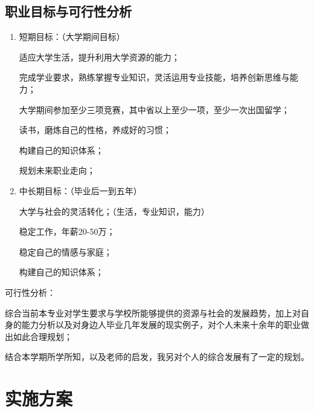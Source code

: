 \documentclass{article}
\begin{document}
\subsection{职业目标与可行性分析}
\par
\begin{enumerate}[(1)]
	\item 短期目标：（大学期间目标）\par
	适应大学生活，提升利用大学资源的能力；\par
	完成学业要求，熟练掌握专业知识，灵活运用专业技能，培养创新思维与能力；\par
	大学期间参加至少三项竞赛，其中省以上至少一项，至少一次出国留学；\par
	读书，磨炼自己的性格，养成好的习惯；\par
	构建自己的知识体系；\par
	规划未来职业走向；\par
	
	
	\item 中长期目标：（毕业后一到五年）\par
	大学与社会的灵活转化；（生活，专业知识，能力）\par
	稳定工作，年薪20-50万；\par
	稳定自己的情感与家庭；\par
	构建自己的知识体系；\par
\end{enumerate}
可行性分析：\par
综合当前本专业对学生要求与学校所能够提供的资源与社会的发展趋势，加上对自身的能力分析以及对身边人毕业几年发展的现实例子，对个人未来十余年的职业做出如此合理规划；\par
结合本学期所学所知，以及老师的启发，我另对个人的综合发展有了一定的规划。\par


\section{实施方案}
\end{document}
